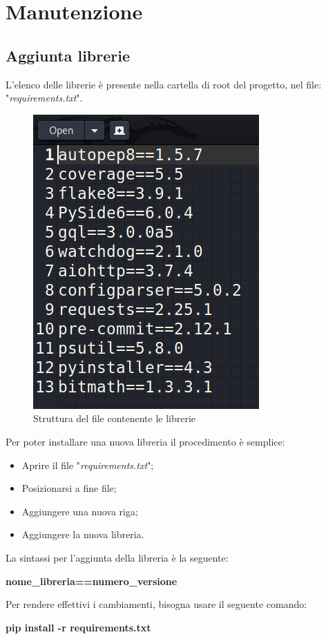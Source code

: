 \section{Manutenzione}

\subsection{Aggiunta librerie}
L'elenco delle librerie è presente nella cartella di root del progetto, nel file: "\textit{requirements.txt}".

\begin{figure}[H]
    \centering
    \includegraphics[scale = 0.5]{components/img/requirements.png}
    \caption{Struttura del file contenente le librerie}
    \label{fig:Struttura del file contentente le librerie}
\end{figure}
Per poter installare una nuova libreria il procedimento è semplice:
\begin{itemize}
	\item Aprire il file "\textit{requirements.txt}";
	\item Posizionarsi a fine file;
	\item Aggiungere una nuova riga;
	\item Aggiungere la nuova libreria.
\end{itemize}
La sintassi per l'aggiunta della libreria è la seguente:
\newline{} \centerline{\textbf{nome\_libreria==numero\_versione}}\newline{}
Per rendere effettivi i cambiamenti, bisogna usare il seguente comando:
\newline{}\centerline{\textbf{pip install -r requirements.txt}}\newline{}

